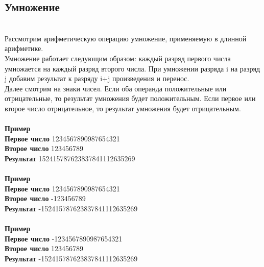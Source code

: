 \documentclass[a4paper]{article}
\begin{document}
\subsection{Умножение}
\\Рассмотрим арифметическую операцию умножение, применяемую в длинной арифметике.
\\Умножение работает следующим образом: каждый разряд первого числа умножается на каждый разряд второго числа. При умножении разряда i на разряд j добавим результат к разряду i+j произведения и перенос.
\\Далее смотрим на знаки чисел. Если оба операнда положительные или отрицательные, то результат умножения будет положительным. Если первое или второе число отрицательное, то результат умножения будет отрицательным.
\\
\\ \textbf{Пример}
\\ \textbf{Первое число} 1234567890987654321
\\ \textbf{Второе число} 123456789
\\ \textbf{Результат} 152415787623837841112635269
\\
\\ \textbf{Пример}
\\ \textbf{Первое число} 1234567890987654321
\\ \textbf{Второе число} -123456789
\\ \textbf{Результат} -152415787623837841112635269
\\
\\ \textbf{Пример}
\\ \textbf{Первое число} -1234567890987654321
\\ \textbf{Второе число} 123456789
\\ \textbf{Результат} -152415787623837841112635269
\end{document}
